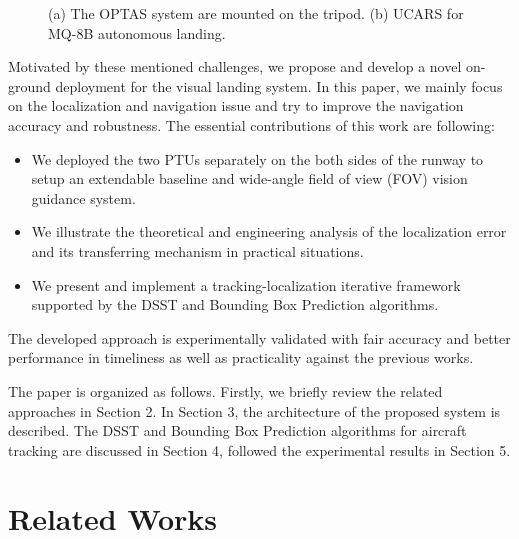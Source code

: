 \documentclass[journal,article,submit,moreauthors,pdftex,10pt,a4paper]{mdpi}
\begin{document}
\begin{figure}[!tb]
	\centering
	\caption{(a) The OPTAS system are mounted on the tripod. (b) UCARS \cite{UCARS} for MQ-8B autonomous landing.}
\end{figure}

Motivated by these mentioned challenges, we propose and develop a novel on-ground deployment for the visual landing system. In this paper, we mainly focus on the localization and navigation issue and try to improve the navigation accuracy and robustness. The essential contributions of this work are following:
\begin{itemize}
	\item We deployed the two PTUs separately on the both sides of the runway to setup an extendable baseline and wide-angle field of view (FOV) vision guidance system.
	\item We illustrate the theoretical and engineering analysis of the localization error and its transferring mechanism in practical situations.
	\item We present and implement a tracking-localization iterative framework supported by the DSST and Bounding Box Prediction algorithms.
\end{itemize}
The developed approach is experimentally validated with fair accuracy and better performance in timeliness as well as practicality against the previous works.

The paper is organized as follows. Firstly, we briefly review the related approaches in Section 2. In Section 3, the architecture of the proposed system is described. The DSST and Bounding Box Prediction algorithms for aircraft tracking are discussed in Section 4, followed the experimental results in Section 5.

\section{Related Works}
\end{document}

